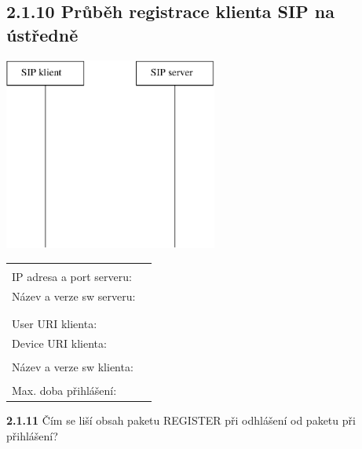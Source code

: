 \documentclass[a4paper,11pt]{article}
\begin{document}
\subsection*{2.1.10 Průběh registrace klienta SIP na ústředně}
\begin{multicols}{2}
  \begin{center}
    \includegraphics[width=70mm]{img/registrace.eps}
  \end{center}
  \columnbreak
  
  \begin{tabular}{lp{2cm}}
    &\\
    IP adresa a port serveru: &\\
    Název a verze sw serveru: &\\
    &\\
    &\\
    User URI klienta: &\\
    Device URI klienta: &\\
    &\\
    Název a verze sw klienta: &\\
    &\\
    Max. doba přihlášení: &\\
  \end{tabular}               
\end{multicols}
   {\bf 2.1.11} Čím se liší obsah paketu REGISTER při odhlášení od paketu při přihlášení?
\end{document}

